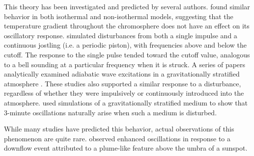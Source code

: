 This theory has been investigated and predicted by several authors.
\cite{Fleck1991}
found similar behavior in both isothermal and non-isothermal models, suggesting
that the temperature gradient throughout the chromosphere does not have an
effect on its oscillatory response.
\cite{Kalkofen1994}
simulated disturbances from both a single impulse and a continuous jostling
(i.e. a periodic piston), with frequencies above and below the cutoff. The
response to the single pulse tended toward the cutoff value, analogous to a
bell sounding at a particular frequency when it is struck. A series of papers
analytically examined adiabatic wave excitations in a gravitationally
stratified atmosphere \citep{Sutmann1995a, Sutmann1995b, Sutmann1998}. These
studies also supported a similar response to a disturbance, regardless of
whether they were impulsively or continuously introduced into the atmosphere.
\cite{Chae2015}
used simulations of a gravitationally stratified medium to show that 3-minute
oscillations naturally arise when such a medium is disturbed.

While many studies have predicted this behavior,
actual observations of this phenomenon are quite rare.
\cite{Kwak2016}
observed enhanced oscillations in response to a downflow
event attributed to a plume-like feature above the umbra of a sunspot.

